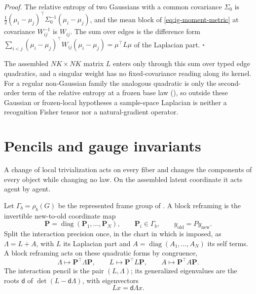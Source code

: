 \noindent\emph{Proof.}
The relative entropy of two Gaussians with a common covariance \(\Sigma_0\) is
\(\tfrac12(\mu_i-\mu_j)^\top\Sigma_0^{-1}(\mu_i-\mu_j)\), and the mean block of
\eqref{eq:ig-moment-metric} at covariance \(W_{ij}^{-1}\) is \(W_{ij}\). The sum over
edges is the difference form
\(\sum_{i<j}(\mu_i-\mu_j)^\top W_{ij}(\mu_i-\mu_j)=\mu^\top L\mu\) of the Laplacian
part. \hfill$\square$

\medskip
The assembled \(NK\times NK\) matrix \(L\) enters only through this sum over
typed edge quadratics, and a singular weight has no fixed-covariance reading along
its kernel. For a regular non-Gaussian family the analogous quadratic is only the
second-order term of the relative entropy at a frozen base law
(), so outside these Gaussian or frozen-local
hypotheses a sample-space Laplacian is neither a recognition Fisher tensor nor a
natural-gradient operator.

\section{Pencils and gauge invariants}
\label{sec:ig-gauge}
\label{sec:grg-spectra}

A change of local trivialization acts on every fiber and changes the components
of every object while changing no law. On the assembled latent coordinate it acts
agent by agent.

Let \(\Gamma_b=\rho_b(G)\) be the represented frame group of
. A block reframing is the invertible new-to-old
coordinate map
\begin{equation}
\mathbf P=\operatorname{diag}(\mathbf P_1,\dots,\mathbf P_N),
\qquad
\mathbf P_i\in\Gamma_b,
\qquad
y_{\mathrm{old}}=Py_{\mathrm{new}}.
\label{eq:ig-reframing}
\end{equation}
Split the interaction precision once, in the chart in which
 is imposed, as \(\Lambda=L+A\), with
\(L\) its Laplacian part and \(A=\operatorname{diag}(A_1,\dots,A_N)\) its self
terms. A block reframing acts on these quadratic forms by congruence,
\begin{equation}
\Lambda\longmapsto \mathbf P^\top\Lambda \mathbf P,
\qquad
L\longmapsto \mathbf P^\top L\mathbf P,
\qquad
A\longmapsto \mathbf P^\top A\mathbf P.
\label{eq:ig-congruence}
\end{equation}
The interaction pencil is the pair \((L,\Lambda)\); its generalized eigenvalues
are the roots \(\mathsf d\) of \(\det(L-\mathsf d\Lambda)\), with eigenvectors
\begin{equation}
Lx=\mathsf d\Lambda x.
\label{eq:ig-pencil}
\end{equation}

